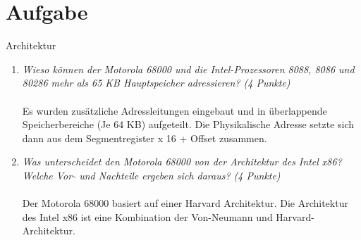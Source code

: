 \documentclass[10pt]{article}
\begin{document}
\section{Aufgabe}
Architektur
\begin{enumerate}[label=\alph*)]
	\item 
	\textit{Wieso können der Motorola 68000 und die Intel-Prozessoren 8088, 8086 und 80286 mehr als 65 KB Hauptspeicher adressieren?
(4 Punkte)	} \\
	\\
	Es wurden zusätzliche Adressleitungen eingebaut und in überlappende Speicherbereiche (Je 64 KB) aufgeteilt. Die Physikalische Adresse setzte sich dann aus dem Segmentregister x 16 + Offset zusammen.	
	
	\item
	\textit{Was unterscheidet den Motorola 68000 von der Architektur des Intel x86? Welche Vor- und Nachteile ergeben sich daraus? (4 Punkte)}\\
	\\
	Der Motorola 68000 basiert auf einer Harvard Architektur.
	Die Architektur des Intel x86 ist eine Kombination der Von-Neumann und Harvard-Architektur.
	
\end{enumerate}
\newpage
\end{document}
